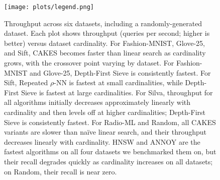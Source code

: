 


\begin{figure}[h]
  \centering



  \vspace{2pt}
  \texttt{[image: plots/legend.png]}

  \caption{Throughput across six datasets, including a randomly-generated dataset.
  Each plot shows throughput (queries per second; higher is better) versus dataset cardinality. For Fashion-MNIST, Glove-25, and Sift, CAKES becomes faster than linear search as cardinality grows, with the crossover point varying by dataset. For Fashion-MNIST and Glove-25, Depth-First Sieve is consistently fastest. For Sift, Repeated $\rho$-NN is fastest at small cardinalities, while Depth-First Sieve is fastest at large cardinalities. For Silva, throughput for all algorithms initially decreases approximately linearly with cardinality and then levels off at higher cardinalities; Depth-First Sieve is consistently fastest. For Radio-ML and Random, all CAKES variants are slower than na\"{i}ve linear search, and their throughput decreases linearly with cardinality. HNSW and ANNOY are the fastest algorithms on all four datasets we benchmarked them on, but their recall degrades quickly as cardinality increases on all datasets; on Random, their recall is near zero.}
  \label{fig:results:scaling-plots}
\end{figure}


